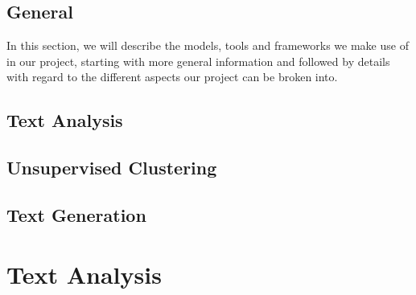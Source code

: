 \documentclass[]{report}
\begin{document}
\section{General}
In this section, we will describe the models, tools and frameworks we make use of in our project, starting with more general information and followed by details with regard to the different aspects our project can be broken into.

\section{Text Analysis}

\section{Unsupervised Clustering}

\section{Text Generation}


\chapter{Text Analysis}



\printbibliography[title={References}]
\end{document}
